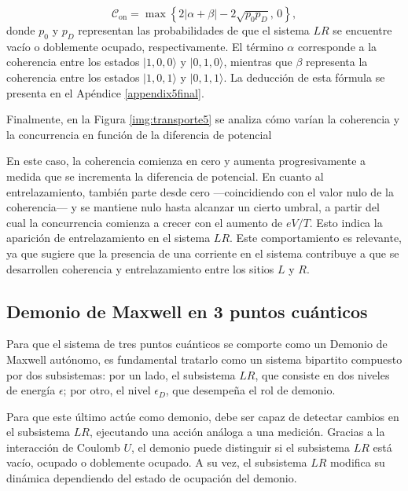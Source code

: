 \begin{equation*}
    \mathcal{C}_{\text{on}} = \max \left\{ 2|\alpha + \beta| - 2\sqrt{p_0 p_D},\, 0 \right\},
\end{equation*}
donde \( p_0 \) y \( p_D \) representan las probabilidades de que el sistema \( LR \) se encuentre vacío o doblemente ocupado, respectivamente. El término \( \alpha \) corresponde a la coherencia entre los estados \(|1,0,0\rangle\) y \(|0,1,0\rangle\), mientras que \( \beta \) representa la coherencia entre los estados \(|1,0,1\rangle\) y \(|0,1,1\rangle\). La deducción de esta fórmula se presenta en el Apéndice \ref{appendix5final}. 

Finalmente, en la Figura \ref{img:transporte5} se analiza cómo varían la coherencia y la concurrencia en función de la diferencia de potencial

    
En este caso, la coherencia comienza en cero y aumenta progresivamente a medida que se incrementa la diferencia de potencial. En cuanto al entrelazamiento, también parte desde cero —coincidiendo con el valor nulo de la coherencia— y se mantiene nulo hasta alcanzar un cierto umbral, a partir del cual la concurrencia comienza a crecer con el aumento de \( eV/T \). Esto indica la aparición de entrelazamiento en el sistema \( LR \). Este comportamiento es relevante, ya que sugiere que la presencia de una corriente en el sistema contribuye a que se desarrollen coherencia y entrelazamiento entre los sitios $L$ y $R$.  


\label{sec5:transporte}



\subsection{Demonio de Maxwell en 3 puntos cuánticos}
Para que el sistema de tres puntos cuánticos se comporte como un Demonio de Maxwell autónomo, es fundamental tratarlo como un sistema bipartito compuesto por dos subsistemas: por un lado, el subsistema $LR$, que consiste en dos niveles de energía $\epsilon$; por otro, el nivel $\epsilon_D$, que desempeña el rol de demonio.

Para que este último actúe como demonio, debe ser capaz de detectar cambios en el subsistema $LR$, ejecutando una acción análoga a una medición. Gracias a la interacción de Coulomb $U$, el demonio puede distinguir si el subsistema $LR$ está vacío, ocupado o doblemente ocupado. A su vez, el subsistema $LR$ modifica su dinámica dependiendo del estado de ocupación del demonio.

